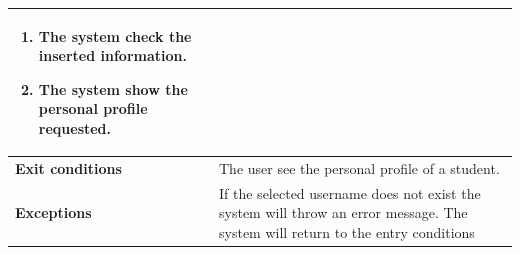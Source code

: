\begin{enumerate}[label=\textbf{UC.\arabic*}]
\begin{table}[H]
\begin{tabular}{|m{3.2cm}|m{9.8cm}|}
\begin{enumerate}[label=\arabic*.]
                        \item The system check the inserted information.
                        \item The system show the personal profile requested.
                    \end{enumerate}\\ 
                    \hline
                    \textbf{Exit conditions}  & The user see the personal profile of a student. \\
                    \hline
                    \textbf{Exceptions} & If the selected username does not exist the system will throw an error message. The system will return to the entry conditions \\
                    \hline
                \end{tabular}
        \end{table}
    \end{enumerate}
    

